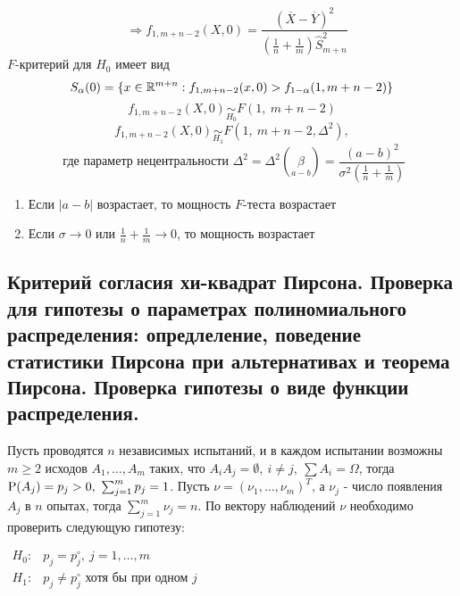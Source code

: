 \begin{example}
\[\begin{array}{l}
\end{array}
\Rightarrow
\boxed{f_{1, m+n-2}(X,0)=\frac{(\overline{X}-\overline{Y})^2}{\left(\frac{1}{n} + \frac{1}{m}\right)\widehat{S}^2_{m+n}}}
\]
$F$-критерий для $H_0$ имеет вид
\[S_{\alpha}(0)=\{x\in\mathbb{R}^{m+n}:f_{1,m+n-2}(x,0)>f_{1-\alpha}(1,m+n-2)\}\]
\[f_{1,m+n-2}(X,0)\underset{H_0}{\sim}F(1,\ m+n-2)\]
\[f_{1,m+n-2}(X,0)\underset{H_1}{\sim}F(1,\ m+n-2,\Delta^2),\]
\[\text{ где параметр нецентральности } \Delta^2=\Delta^2(\underset{a-b}{\beta})=\frac{(a-b)^2}{\sigma^2\left(\frac{1}{n}+\frac{1}{m}\right)}\]
\begin{enumerate}
    \item Если $\vert a-b\vert$  возрастает, то мощность $F$-теста возрастает
    \item Если $\sigma\rightarrow0$ или $\frac{1}{n}+\frac{1}{m}\rightarrow0$, то мощность возрастает
\end{enumerate}
\end{example}

\subsection{Критерий согласия хи-квадрат Пирсона. Проверка для гипотезы о параметрах полиномиального распределения:
опредлеление, поведение статистики Пирсона при альтернативах и теорема Пирсона. Проверка гипотезы о виде функции распределения.}
Пусть проводятся $n$ независимых испытаний, и в каждом испытании возможны
$m\geq2$ исходов $A_1,\ldots,A_m$ таких, что $A_iA_j=\emptyset,\ i\neq j,\ \sum A_i=\Omega$, тогда
$\P(A_j)=p_j>0,\ \sum_{j=1}^mp_j=1$. Пусть $\nu=(\nu_1,\ldots,\nu_m)^T$, а $\nu_j$ -
число появления $A_j$ в $n$ опытах, тогда $\sum_{j=1}^m\nu_j=n$.
По вектору наблюдений $\nu$ необходимо проверить следующую гипотезу:

$\begin{array}{cl}
    H_0:& p_j=p_j^\circ,\ j=1,\ldots,m\\
    H_1:& p_j\neq p_j^\circ\text{ хотя бы при одном $j$}
\end{array}$


